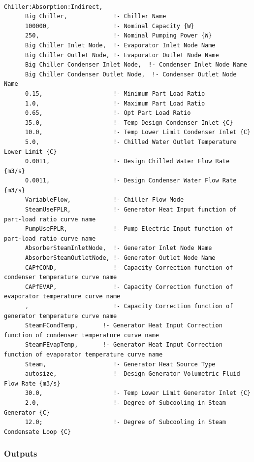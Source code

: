 \begin{lstlisting}

Chiller:Absorption:Indirect,
      Big Chiller,             !- Chiller Name
      100000,                  !- Nominal Capacity {W}
      250,                     !- Nominal Pumping Power {W}
      Big Chiller Inlet Node,  !- Evaporator Inlet Node Name
      Big Chiller Outlet Node, !- Evaporator Outlet Node Name
      Big Chiller Condenser Inlet Node,  !- Condenser Inlet Node Name
      Big Chiller Condenser Outlet Node,  !- Condenser Outlet Node Name
      0.15,                    !- Minimum Part Load Ratio
      1.0,                     !- Maximum Part Load Ratio
      0.65,                    !- Opt Part Load Ratio
      35.0,                    !- Temp Design Condenser Inlet {C}
      10.0,                    !- Temp Lower Limit Condenser Inlet {C}
      5.0,                     !- Chilled Water Outlet Temperature Lower Limit {C}
      0.0011,                  !- Design Chilled Water Flow Rate {m3/s}
      0.0011,                  !- Design Condenser Water Flow Rate {m3/s}
      VariableFlow,            !- Chiller Flow Mode
      SteamUseFPLR,            !- Generator Heat Input function of part-load ratio curve name
      PumpUseFPLR,             !- Pump Electric Input function of part-load ratio curve name
      AbsorberSteamInletNode,  !- Generator Inlet Node Name
      AbsorberSteamOutletNode, !- Generator Outlet Node Name
      CAPfCOND,                !- Capacity Correction function of condenser temperature curve name
      CAPfEVAP,                !- Capacity Correction function of evaporator temperature curve name
      ,                        !- Capacity Correction function of generator temperature curve name
      SteamFCondTemp,       !- Generator Heat Input Correction function of condenser temperature curve name
      SteamFEvapTemp,       !- Generator Heat Input Correction function of evaporator temperature curve name
      Steam,                   !- Generator Heat Source Type
      autosize,                !- Design Generator Volumetric Fluid Flow Rate {m3/s}
      30.0,                    !- Temp Lower Limit Generator Inlet {C}
      2.0,                     !- Degree of Subcooling in Steam Generator {C}
      12.0;                    !- Degree of Subcooling in Steam Condensate Loop {C}
\end{lstlisting}

\subsubsection{Outputs}\label{outputs-1-019}

